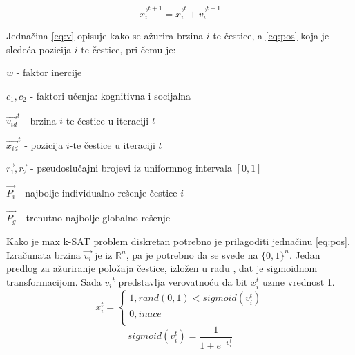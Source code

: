 \documentclass{article}
\begin{document}
\begin{equation}\label{eq:pos}
\vec{x_{i}}^{t+1} = \vec{x_{i}}^{t} + \vec{v_{i}}^{t+1} 
\end{equation}

Jednačina \ref{eq:v} opisuje kako se ažurira brzina $i$-te čestice, a \ref{eq:pos} koja je sledeća pozicija $i$-te čestice, pri čemu je: 

\begin{list}{•}{}
	\item $w$ - faktor inercije
	\item $c_1, c_2$ - faktori učenja: kognitivna i socijalna
	\item $\vec{v_{id}}^{t}$ - brzina $i$-te čestice u iteraciji $t$ 
	\item $\vec{x_{id}}^{t}$ - pozicija $i$-te čestice u iteraciji $t$ 
	\item $\vec{r_1}, \vec{r_2}$ - pseudoslučajni brojevi iz uniformnog intervala $[0,1]$
	\item $\vec{P_i}$ - najbolje individualno rešenje čestice $i$
	\item $\vec{P_g}$ - trenutno najbolje globalno rešenje\\ 
\end{list}

Kako je max k-SAT problem diskretan potrebno je prilagoditi jednačinu \ref{eq:pos}. Izračunata brzina $\vec{v_{i}}$ je iz $\mathbb{R}^n$, pa je potrebno da se svede na $\{ 0,1 \}^n$. Jedan predlog za ažuriranje položaja čestice, izložen u radu \cite{sigmoid}, dat je sigmoidnom transformacijom. Sada ${v_{i}}^{t}$ predstavlja verovatnoću da bit $x_{i}^{t}$ uzme vrednost 1.  \\

\begin{equation}\label{eq:posSIGMOID}
x_{i}^{t}=\begin{cases}
               1, rand(0,1) < sigmoid(v_{i}^{t})\\
               0, inace\\
            \end{cases}
\end{equation}\label{eq:sigmoid}
\begin{equation}
sigmoid(v_{i}^{t}) = \frac{1}{1+e^{-v_{i}^{t}}}
\end{equation}
 
 
\end{document}
